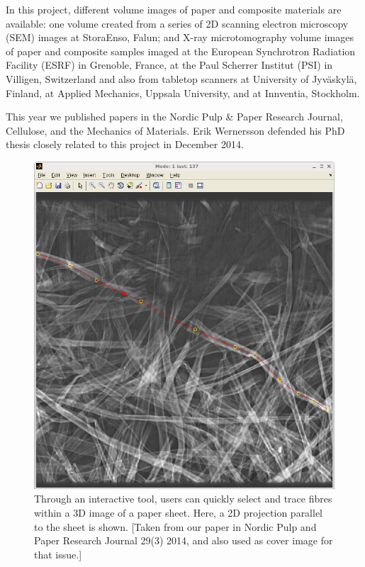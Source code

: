 {\begin{enumerate}
{		In this project, different volume images of paper and composite materials are available: one volume
		created from a series of 2D scanning electron microscopy (SEM) images at StoraEnso, Falun; and
		X-ray microtomography volume images of paper and composite samples imaged at the European
		Synchrotron Radiation Facility (ESRF) in Grenoble, France, at the Paul Scherrer Institut (PSI) in
		Villigen, Switzerland and also from tabletop scanners at University of Jyv\"{a}skyl\"{a}, Finland,
		at Applied Mechanics, Uppsala University, and at Innventia, Stockholm.
		
		This year we published papers in the Nordic Pulp \& Paper Research Journal,
		Cellulose, and the Mechanics of Materials. Erik Wernersson defended his PhD thesis closely related to this project in December 2014.}
	
	\begin{figure}[!h]
		\centering
		
		\includegraphics[width=0.48\linewidth]{figures/research/eric.png}
		\caption{Through an interactive tool, users can quickly select and trace fibres within a 3D image of a paper sheet. Here, a 2D projection parallel to the sheet is shown. [Taken from our paper in Nordic Pulp and Paper Research Journal 29(3) 2014, and also used as cover image for that issue.]}
		\label{fig:woodseg}
	\end{figure}
	
	
	
	
	
	

\end{enumerate}}
